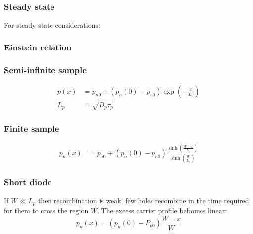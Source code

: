 \documentclass[a4paper, fontsize=8pt, landscape, DIV=1]{scrartcl}
\begin{document}
\begin{multicols*}{4}
    \subsubsection{Steady state}
    For steady state considerations:

    
    \subsubsection{Einstein relation}
    \begin{center}
       
    \end{center}

    \subsubsection{Semi-infinite sample}
    \begin{align*}
      p(x) &= p_{n0} + (p_n(0)-p_{n0}) \exp\left(-\frac{x}{L_p}\right) \\
      L_p &= \sqrt{D_p\tau_p}
    \end{align*}

    \subsubsection{Finite sample}
    \begin{align*}
      p_n(x) &= p_{n0} + (p_n(0)-p_{n0}) \frac{\sinh\left(\frac{W-x}{L_p}\right)}{\sinh\left(\frac{W}{L_p}\right)}
    \end{align*}
    
    \subsubsection{Short diode}
    If $W \ll L_p$ then recombination is weak, few holes recombine in the time required for them to cross the region $W$.
    The excess carrier profile bebomes linear:
    \[p_n(x) = (p_n(0)-P_{n0})\frac{W-x}{W}\]




\end{multicols*}
\end{document}
